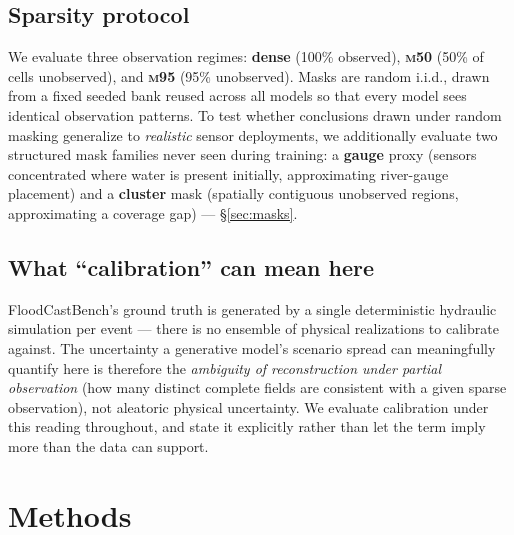 \documentclass[11pt]{article}
\newcommand{\mfifty}{\textsc{m50}}
\newcommand{\mninetyfive}{\textsc{m95}}
\begin{document}
\subsection{Sparsity protocol}
We evaluate three observation regimes: \textbf{dense} (100\% observed),
\textbf{\mfifty} (50\% of cells unobserved), and \textbf{\mninetyfive}
(95\% unobserved). Masks are random i.i.d., drawn from a fixed seeded bank
reused across all models so that every model sees identical observation
patterns. To test whether conclusions drawn under random masking
generalize to \emph{realistic} sensor deployments, we additionally
evaluate two structured mask families never seen during training: a
\textbf{gauge} proxy (sensors concentrated where water is present
initially, approximating river-gauge placement) and a \textbf{cluster}
mask (spatially contiguous unobserved regions, approximating a coverage
gap) --- \S\ref{sec:masks}.

\subsection{What ``calibration'' can mean here}
\label{sec:calibmeaning}
FloodCastBench's ground truth is generated by a single deterministic
hydraulic simulation per event --- there is no ensemble of physical
realizations to calibrate against. The uncertainty a generative model's
scenario spread can meaningfully quantify here is therefore the
\emph{ambiguity of reconstruction under partial observation} (how many
distinct complete fields are consistent with a given sparse observation),
not aleatoric physical uncertainty. We evaluate calibration under this
reading throughout, and state it explicitly rather than let the term imply
more than the data can support.

\section{Methods}
\label{sec:methods}
\end{document}
